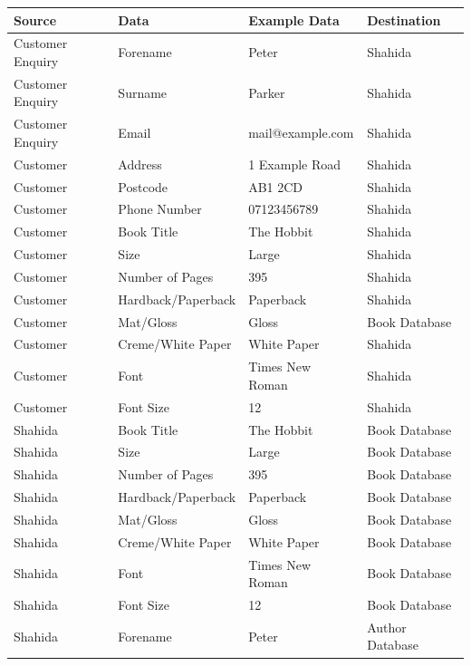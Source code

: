 \begin{center}
\begin{tabular}{|p{1.5cm}|p{3cm}|p{3cm}|p{2.5cm}|}
    \hline
    \textbf{Source} & \textbf{Data} & \textbf{Example Data} & \textbf{Destination} \\ \hline
    Customer Enquiry & Forename & Peter & Shahida  \\ \hline
    Customer Enquiry & Surname & Parker & Shahida  \\ \hline
    Customer Enquiry & Email & mail@example.com & Shahida  \\ \hline
    Customer & Address & 1 Example Road & Shahida  \\ \hline
    Customer & Postcode & AB1 2CD & Shahida  \\ \hline
    Customer & Phone Number & 07123456789 & Shahida  \\ \hline
    Customer & Book Title & The Hobbit & Shahida \\  \hline
    Customer & Size & Large & Shahida \\  \hline
    Customer & Number of Pages & 395 & Shahida \\  \hline
    Customer & Hardback/Paperback & Paperback & Shahida \\  \hline
    Customer & Mat/Gloss & Gloss & Book Database \\  \hline
    Customer & Creme/White Paper & White Paper & Shahida \\  \hline
    Customer & Font & Times New Roman & Shahida \\  \hline
    Customer & Font Size & 12 & Shahida \\  \hline
    Shahida & Book Title & The Hobbit & Book Database \\  \hline
    Shahida & Size & Large & Book Database \\  \hline
    Shahida & Number of Pages & 395 & Book Database \\  \hline
    Shahida & Hardback/Paperback & Paperback & Book Database \\  \hline
    Shahida & Mat/Gloss & Gloss & Book Database \\  \hline
    Shahida & Creme/White Paper & White Paper & Book Database \\  \hline
    Shahida & Font & Times New Roman & Book Database \\  \hline
    Shahida & Font Size & 12 & Book Database \\  \hline
    Shahida & Forename & Peter & Author Database  \\ \hline

\end{tabular}
\end{center}

